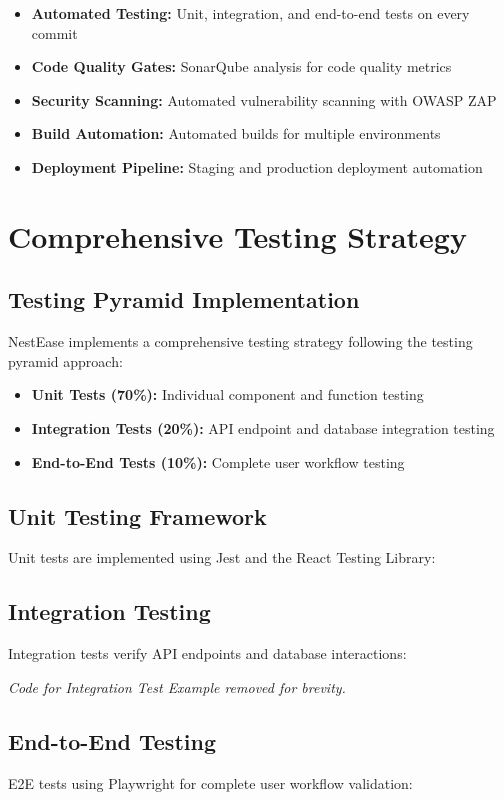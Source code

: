 \documentclass[conference]{IEEEtran}
\begin{document}
\begin{itemize}
    \item \textbf{Automated Testing:} Unit, integration, and end-to-end tests on every commit
    \item \textbf{Code Quality Gates:} SonarQube analysis for code quality metrics
    \item \textbf{Security Scanning:} Automated vulnerability scanning with OWASP ZAP
    \item \textbf{Build Automation:} Automated builds for multiple environments
    \item \textbf{Deployment Pipeline:} Staging and production deployment automation
\end{itemize}

\section{Comprehensive Testing Strategy}
\subsection{Testing Pyramid Implementation}
NestEase implements a comprehensive testing strategy following the testing pyramid approach:

\begin{itemize}
    \item \textbf{Unit Tests (70\%):} Individual component and function testing
    \item \textbf{Integration Tests (20\%):} API endpoint and database integration testing
    \item \textbf{End-to-End Tests (10\%):} Complete user workflow testing
\end{itemize}

\subsection{Unit Testing Framework}
Unit tests are implemented using Jest and the React Testing Library:

\subsection{Integration Testing}
Integration tests verify API endpoints and database interactions:

\textit{Code for Integration Test Example removed for brevity.}

\subsection{End-to-End Testing}
E2E tests using Playwright for complete user workflow validation:
\end{document}
